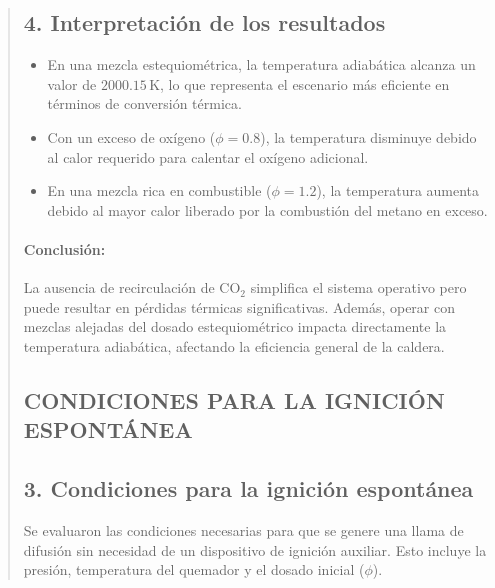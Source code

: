 \documentclass[11pt, a4paper]{article}
\begin{document}
\begin{quote}
\begin{center}
\begin{adjustwidth}{-1.7cm}{-1cm}
\subsection*{4. Interpretación de los resultados}

\begin{itemize}
    \item En una mezcla estequiométrica, la temperatura adiabática alcanza un valor de \(2000.15 \, \text{K}\), lo que representa el escenario más eficiente en términos de conversión térmica.
    \item Con un exceso de oxígeno (\(\phi = 0.8\)), la temperatura disminuye debido al calor requerido para calentar el oxígeno adicional.
    \item En una mezcla rica en combustible (\(\phi = 1.2\)), la temperatura aumenta debido al mayor calor liberado por la combustión del metano en exceso.
\end{itemize}

\paragraph{Conclusión:}
La ausencia de recirculación de \(\text{CO}_2\) simplifica el sistema operativo pero puede resultar en pérdidas térmicas significativas. Además, operar con mezclas alejadas del dosado estequiométrico impacta directamente la temperatura adiabática, afectando la eficiencia general de la caldera.


\newpage
\vspace*{0.1cm} %
\hypertarget{ignicionespontanea}{%
\subsection{CONDICIONES PARA LA IGNICIÓN ESPONTÁNEA}\label{ignicionespontanea}}
\vspace*{0.5cm} %

\subsection*{3. Condiciones para la ignición espontánea}

Se evaluaron las condiciones necesarias para que se genere una llama de difusión sin necesidad de un dispositivo de ignición auxiliar. Esto incluye la presión, temperatura del quemador y el dosado inicial (\(\phi\)).


\end{adjustwidth}
\end{center}
\end{quote}
\end{document}
